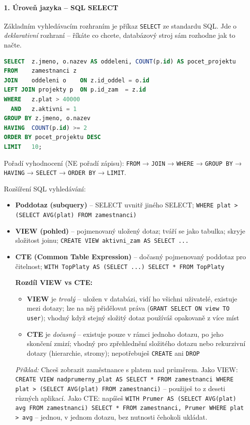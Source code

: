 \paragraph{1. Úroveň jazyka -- SQL SELECT}
Základním vyhledávacím rozhraním je příkaz \texttt{SELECT} ze standardu SQL.
Jde o \textit{deklarativní} rozhraní -- říkáte co chcete, databázový stroj sám rozhodne jak to načte.

\begin{lstlisting}[language=SQL, caption=Anatomie SQL SELECT -- plný dotaz]
SELECT  z.jmeno, o.nazev AS oddeleni, COUNT(p.id) AS pocet_projektu
FROM    zamestnanci z
JOIN    oddeleni o    ON z.id_oddel = o.id
LEFT JOIN projekty p  ON p.id_zam  = z.id
WHERE   z.plat > 40000
  AND   z.aktivni = 1
GROUP BY z.jmeno, o.nazev
HAVING  COUNT(p.id) >= 2
ORDER BY pocet_projektu DESC
LIMIT   10;
\end{lstlisting}

Pořadí vyhodnocení (NE pořadí zápisu): \texttt{FROM} → \texttt{JOIN} → \texttt{WHERE} →
\texttt{GROUP BY} → \texttt{HAVING} → \texttt{SELECT} → \texttt{ORDER BY} → \texttt{LIMIT}.

Rozšíření SQL vyhledávání:
\begin{itemize}
  \item \textbf{Poddotaz (subquery)} -- SELECT uvnitř jiného SELECT;
    \texttt{WHERE plat > (SELECT AVG(plat) FROM zamestnanci)}
  \item \textbf{VIEW (pohled)} -- pojmenovaný uložený dotaz; tváří se jako tabulka;
    skryje složitost joinu; \texttt{CREATE VIEW aktivni\_zam AS SELECT ...}
  \item \textbf{CTE (Common Table Expression)} -- dočasný pojmenovaný poddotaz pro čitelnost;
    \texttt{WITH TopPlaty AS (SELECT ...) SELECT * FROM TopPlaty}

\textbf{Rozdíl VIEW vs CTE:}
\begin{itemize}
  \item \textbf{VIEW} je \textit{trvalý} -- uložen v databázi, vidí ho všichni uživatelé, existuje mezi dotazy; lze na něj přidělovat práva (\texttt{GRANT SELECT ON view TO user}); vhodný když stejný složitý dotaz používáš opakovaně z více míst
  \item \textbf{CTE} je \textit{dočasný} -- existuje pouze v rámci jednoho dotazu, po jeho skončení zmizí; vhodný pro zpřehlednění složitého dotazu nebo rekurzivní dotazy (hierarchie, stromy); nepotřebuješ \texttt{CREATE} ani \texttt{DROP}
\end{itemize}
\textit{Příklad:} Chceš zobrazit zaměstnance s platem nad průměrem. Jako VIEW: \texttt{CREATE VIEW nadprumerny\_plat AS SELECT * FROM zamestnanci WHERE plat > (SELECT AVG(plat) FROM zamestnanci)} -- použiješ to z deseti různých aplikací. Jako CTE: napíšeš \texttt{WITH Prumer AS (SELECT AVG(plat) avg FROM zamestnanci) SELECT * FROM zamestnanci, Prumer WHERE plat > avg} -- jednou, v jednom dotazu, bez nutnosti čehokoli ukládat.
\end{itemize}


